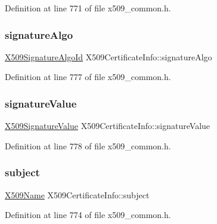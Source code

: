 Definition at line 771 of file x509\+\_\+common.\+h.

\mbox{\label{structX509CertificateInfo_a557f43736fe7dab190eac1cd31559281}} 
\subsubsection{\texorpdfstring{signature\+Algo}{signatureAlgo}}
{\footnotesize\ttfamily \hyperlink{structX509SignatureAlgoId}{X509\+Signature\+Algo\+Id} X509\+Certificate\+Info\+::signature\+Algo}



Definition at line 777 of file x509\+\_\+common.\+h.

\mbox{\label{structX509CertificateInfo_a14aae7b8131fdc0d1cae4ccc6be1f02d}} 
\subsubsection{\texorpdfstring{signature\+Value}{signatureValue}}
{\footnotesize\ttfamily \hyperlink{structX509SignatureValue}{X509\+Signature\+Value} X509\+Certificate\+Info\+::signature\+Value}



Definition at line 778 of file x509\+\_\+common.\+h.

\mbox{\label{structX509CertificateInfo_adaf5e2c713f42a2ca307b2d4eed55a0e}} 
\subsubsection{\texorpdfstring{subject}{subject}}
{\footnotesize\ttfamily \hyperlink{structX509Name}{X509\+Name} X509\+Certificate\+Info\+::subject}



Definition at line 774 of file x509\+\_\+common.\+h.

